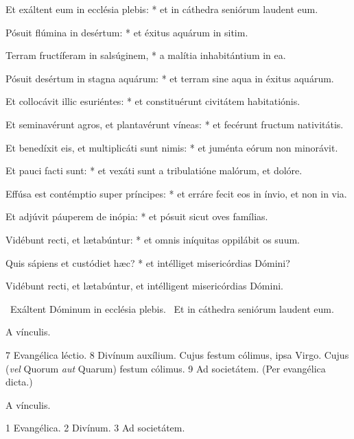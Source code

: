 Et exáltent eum in ecclésia plebis: * et in cáthedra seniórum laudent eum.

Pósuit flúmina in desértum: * et éxitus aquárum in sitim.

Terram fructíferam in salsúginem, * a malítia inhabitántium in ea.

Pósuit desértum in stagna aquárum: * et terram sine aqua in éxitus aquárum.

Et collocávit illic esuriéntes: * et constituérunt civitátem habitatiónis.

Et seminavérunt agros, et plantavérunt víneas: * et fecérunt fructum nativitátis.

Et benedíxit eis, et multiplicáti sunt nimis: * et juménta eórum non minorávit.

Et pauci facti sunt: * et vexáti sunt a tribulatióne malórum, et dolóre.

Effúsa est contémptio super príncipes: * et erráre fecit eos in ínvio, et non in via.

Et adjúvit páuperem de inópia: * et pósuit sicut oves famílias.

Vidébunt recti, et lætabúntur: * et omnis iníquitas oppilábit os suum.

Quis sápiens et custódiet hæc? * et intélliget misericórdias Dómini?

 Vidébunt recti, et lætabúntur, et intélligent misericórdias Dómini.


\V\ Exáltent Dóminum in ecclésia plebis. \R\ Et in cáthedra seniórum laudent eum.


 A vínculis.

 7 Evangélica léctio. 8  Divínum auxílium.  Cujus festum cólimus, ipsa Virgo.  Cujus (\textit{vel} Quorum \textit{aut} Quarum) festum cólimus. 9 Ad societátem. (Per evangélica dicta.)


 A vínculis.


 1 Evangélica. 2 Divínum. 3 Ad societátem.


